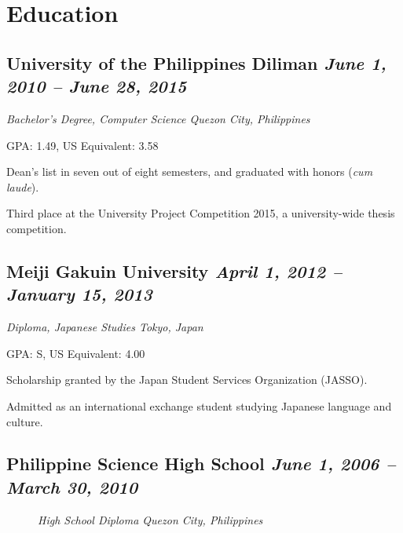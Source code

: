 \section*{Education}

\subsection*{{\color{special-color}University of the Philippines Diliman \hfill \textnormal{\emph{June 1, 2010 -- June 28, 2015}}}}
\begin{description}
  \item[\faGraduationCap] \emph{Bachelor's Degree, Computer Science \hfill {\color{gray}Quezon City, Philippines}}
  \item[\faTrophy] GPA: 1.49, US Equivalent: 3.58
  \item Dean's list in seven out of eight semesters, and graduated with honors (\emph{cum laude}).
  \item Third place at the University Project Competition 2015, a university-wide thesis competition.
\end{description}

\subsection*{{\color{special-color}Meiji Gakuin University \hfill \textnormal{\emph{April 1, 2012 -- January 15, 2013}}}}
\begin{description}
  \item[\faGraduationCap]\emph{Diploma, Japanese Studies \hfill {\color{gray}Tokyo, Japan}}
  \item[\faTrophy] GPA: S, US Equivalent: 4.00
  \item Scholarship granted by the Japan Student Services Organization (JASSO).
  \item Admitted as an international exchange student studying Japanese language and culture.
\end{description}

\subsection*{{\color{special-color}Philippine Science High School \hfill \textnormal{\emph{June 1, 2006 -- March 30, 2010}}}}
\begin{description}
  \item[\faGraduationCap]\emph{High School Diploma \hfill {\color{gray}Quezon City, Philippines}}
\end{description}